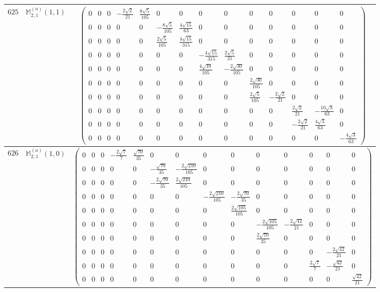 \documentclass[fleqn,8pt,landscape]{jsarticle}
\begin{document}
\begin{center}
\begin{longtable}{ccc}
$ 625 $ & $ \mathbb{M}_{2,1}^{(a)}(1,1) $ & $ \begin{pmatrix} 0 & 0 & 0 & - \frac{2 \sqrt{2}}{21} & \frac{8 \sqrt{5}}{105} & 0 & 0 & 0 & 0 & 0 & 0 & 0 & 0 & 0 \\ 0 & 0 & 0 & 0 & 0 & - \frac{8 \sqrt{5}}{105} & \frac{4 \sqrt{15}}{63} & 0 & 0 & 0 & 0 & 0 & 0 & 0 \\ 0 & 0 & 0 & 0 & 0 & \frac{2 \sqrt{5}}{105} & \frac{4 \sqrt{15}}{315} & 0 & 0 & 0 & 0 & 0 & 0 & 0 \\ 0 & 0 & 0 & 0 & 0 & 0 & 0 & - \frac{4 \sqrt{15}}{315} & \frac{2 \sqrt{5}}{21} & 0 & 0 & 0 & 0 & 0 \\ 0 & 0 & 0 & 0 & 0 & 0 & 0 & \frac{4 \sqrt{10}}{105} & - \frac{2 \sqrt{30}}{105} & 0 & 0 & 0 & 0 & 0 \\ 0 & 0 & 0 & 0 & 0 & 0 & 0 & 0 & 0 & \frac{2 \sqrt{30}}{105} & 0 & 0 & 0 & 0 \\ 0 & 0 & 0 & 0 & 0 & 0 & 0 & 0 & 0 & \frac{2 \sqrt{5}}{105} & - \frac{2 \sqrt{2}}{21} & 0 & 0 & 0 \\ 0 & 0 & 0 & 0 & 0 & 0 & 0 & 0 & 0 & 0 & 0 & \frac{2 \sqrt{2}}{21} & - \frac{10 \sqrt{3}}{63} & 0 \\ 0 & 0 & 0 & 0 & 0 & 0 & 0 & 0 & 0 & 0 & 0 & - \frac{2 \sqrt{2}}{21} & \frac{4 \sqrt{3}}{63} & 0 \\ 0 & 0 & 0 & 0 & 0 & 0 & 0 & 0 & 0 & 0 & 0 & 0 & 0 & - \frac{4 \sqrt{3}}{63} \end{pmatrix} $ \\ \hline
$ 626 $ & $ \mathbb{M}_{2,1}^{(a)}(1,0) $ & $ \begin{pmatrix} 0 & 0 & 0 & - \frac{2 \sqrt{7}}{7} & \frac{\sqrt{70}}{35} & 0 & 0 & 0 & 0 & 0 & 0 & 0 & 0 & 0 \\ 0 & 0 & 0 & 0 & 0 & - \frac{\sqrt{70}}{35} & - \frac{2 \sqrt{210}}{105} & 0 & 0 & 0 & 0 & 0 & 0 & 0 \\ 0 & 0 & 0 & 0 & 0 & - \frac{2 \sqrt{70}}{35} & \frac{2 \sqrt{210}}{105} & 0 & 0 & 0 & 0 & 0 & 0 & 0 \\ 0 & 0 & 0 & 0 & 0 & 0 & 0 & - \frac{2 \sqrt{210}}{105} & - \frac{2 \sqrt{70}}{35} & 0 & 0 & 0 & 0 & 0 \\ 0 & 0 & 0 & 0 & 0 & 0 & 0 & 0 & \frac{2 \sqrt{105}}{105} & 0 & 0 & 0 & 0 & 0 \\ 0 & 0 & 0 & 0 & 0 & 0 & 0 & 0 & 0 & - \frac{2 \sqrt{105}}{105} & - \frac{2 \sqrt{42}}{21} & 0 & 0 & 0 \\ 0 & 0 & 0 & 0 & 0 & 0 & 0 & 0 & 0 & \frac{2 \sqrt{70}}{35} & 0 & 0 & 0 & 0 \\ 0 & 0 & 0 & 0 & 0 & 0 & 0 & 0 & 0 & 0 & 0 & 0 & - \frac{2 \sqrt{42}}{21} & 0 \\ 0 & 0 & 0 & 0 & 0 & 0 & 0 & 0 & 0 & 0 & 0 & \frac{2 \sqrt{7}}{7} & - \frac{\sqrt{42}}{21} & 0 \\ 0 & 0 & 0 & 0 & 0 & 0 & 0 & 0 & 0 & 0 & 0 & 0 & 0 & \frac{\sqrt{42}}{21} \end{pmatrix} $ \\ \hline

\end{longtable}
\end{center}
\end{document}
